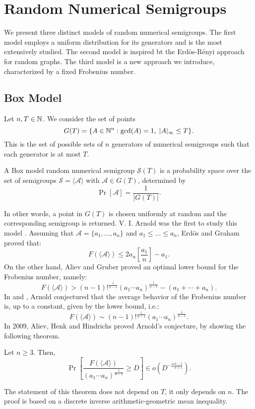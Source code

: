 
\chapter{Random Numerical Semigroups}\label{chap:randnumsems}

We present three distinct models of random numerical semigroups. The first model employs a uniform distribution for its generators and is the most extensively studied. The second model is inspired bt the Erdös-Rényi approach for random graphs. The third model is a new approach we introduce, characterized by a fixed Frobenius number.

\section{Box Model}\label{sec:randomsmpgs:intro}

Let $n, T \in \mathbb{N}$. We consider the set of points
\[G(T) = \{A\in \mathbb{N}^n : \mathrm{gcd}(A) = 1, \; |A|_\infty \leq T\}.\]
This is the set of possible sets of $n$ generators of numerical semigroups such that each generator is at most $T$. 
\begin{definition}
    A Box model random numerical semigroup $\mathcal{S}(T)$ is a probability space over the set of semigroups $\mathcal{S} = \langle\mathcal{A}\rangle$ with $\mathcal{A} \in G(T)$, determined by
    \[\Pr[ \mathcal{A}] = \frac{1}{|G(T)|}.\]
\end{definition}
In other words, a point in $G(T)$ is chosen uniformly at random and the corresponding semigroup is returned. V. I. Arnold was the first to study this model \cite{arnold1999weak}.  Assuming that $\mathcal{A} = \{a_1, \ldots, a_n\}$ and $a_1 \leq \ldots \leq a_n$, Erdös and Graham \cite{erdos1972linear} proved that: 
\[F(\langle\mathcal{A} \rangle)  \leq 2 a_n\left[\frac{a_1}{n}\right]  - a_1.\]
On the other hand, Aliev and Gruber \cite{aliev2007optimal} proved an optimal lower bound for the Frobenius number, namely:
\[F(\langle\mathcal{A} \rangle)  > (n - 1)!^{\frac{1}{n - 1}}(a_1\cdots a_n)^{\frac{1}{n - 1}} - (a_1 + \cdots + a_n).\]
In \cite{arnold1999weak} and \cite{arnold2004arnold}, Arnold conjectured that the average behavior of the Frobenius number is, up to a constant, given by the lower bound, i.e.:
\[F(\langle\mathcal{A}\rangle) \sim (n - 1)!^{\frac{1}{n - 1}}(a_1\cdots a_n)^{\frac{1}{n - 1}}.\]
In 2009, Aliev, Henk and Hindrichs \cite{aliev2011expected} proved Arnold's conjecture, by showing the following theorem. 
\begin{theorem} Let $n \geq 3$. Then, 
    \[\Pr\left[\frac{F(\langle\mathcal{A}\rangle)}{(a_1\cdots a_n)^{\frac{1}{n - 1}}}\geq D\right]  \in o(D^{-2\frac{n - 1}{n + 1}}).\]
\end{theorem}
The statement of this theorem does not depend on $T$, it only depends on $n$. The proof is based on a discrete inverse arithmetic-geometric mean inequality.

